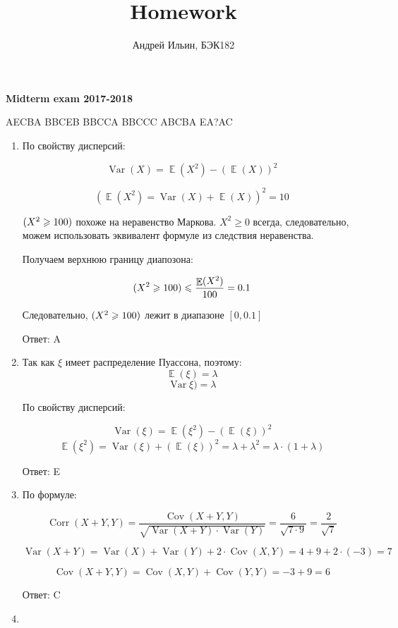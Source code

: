 \documentclass[a4paper]{article} %
\title{Homework}
\author{Андрей Ильин, БЭК182}
\DeclareMathOperator{\Var}{Var}
\DeclareMathOperator{\Cov}{Cov}
\DeclareMathOperator{\Corr}{Corr}
\DeclareMathOperator{\E}{\mathbb{E}}
\let\P\relax
\DeclareMathOperator{\P}{\mathbb{P}}
\renewcommand{\leq}{\leqslant}
\renewcommand{\geq}{\geqslant}
\begin{document}
\maketitle



\textbf{Midterm exam 2017-2018}

AECBA BBCEB BBCCA BBCCC ABCBA EA?AC

\begin{enumerate}

    \item

    По свойству дисперсий:

    \[ \Var(X) = \E(X^2) - (\E(X))^2 \]

    \[ (\E(X^2) = \Var(X) + \E(X))^2 = 10\]
    
    $\P(X^2 \geq 100)$ похоже на неравенство Маркова. $X^2 \geq 0$ всегда, следовательно, можем использовать эквивалент формуле из следствия неравенства.
    
    Получаем верхнюю границу диапозона:

    \[\P(X^2 \geq 100) \leq \frac{\E(X^2)}{100} = 0.1 \]
    
    Следовательно, $\P(X^2 \geq 100)$ лежит в диапазоне $[0, 0.1]$

    Ответ: A

    \item

    Так как $\xi$ имеет распределение Пуассона, поэтому:
    \[ \E(\xi) =\lambda \]
    \[ \Var\xi) =\lambda \]
    
    По свойству дисперсий:
    
    \[ \Var(\xi) = \E(\xi^2) - (\E(\xi))^2 \]
    \[ \E(\xi^2) = \Var(\xi) + (\E(\xi))^2 = \lambda + \lambda^2 = \lambda \cdot (1 + \lambda)\]

    Ответ: E

    \item
    
    По формуле:

    \[ \Corr(X+Y,Y) = \frac{\Cov(X+Y,Y)}{\sqrt{\Var(X+Y)\cdot \Var(Y)}} = \frac{6}{\sqrt{7\cdot 9}} = \frac{2}{\sqrt{7}} \]

    \[ \Var(X+Y) = \Var(X) + \Var(Y) + 2 \cdot \Cov(X,Y) = 4 + 9 + 2 \cdot (-3) = 7 \]

    \[\Cov(X+Y,Y) = \Cov(X,Y) + \Cov(Y,Y) = -3 + 9 = 6\]

    Ответ: C

    \item
    

\end{enumerate}
\end{document}
